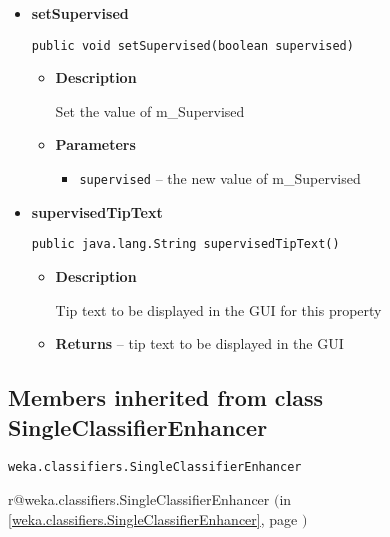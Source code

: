 \documentclass[11pt,a4paper]{report}
\makeatletter
\newcommand{\refdefined}[1]{
\expandafter\ifx\csname r@#1\endcsname\relax
\relax\else
{$($in \ref{#1}, page \pageref{#1}$)$}\fi}
\makeatother
\begin{document}
{{{{{\begin{itemize}
{\begin{itemize}
{Set the value of m\_RandomData
}
\item{
{\bf  Parameters}
  \begin{itemize}
   \item{
\texttt{randomData} -- new value of m\_RandomData}
  \end{itemize}
}%
\end{itemize}
}%
\item{ 
{\bf  setSupervised}\\
\begin{lstlisting}[frame=none]
public void setSupervised(boolean supervised)\end{lstlisting} %
\begin{itemize}
\item{
{\bf  Description}

Set the value of m\_Supervised
}
\item{
{\bf  Parameters}
  \begin{itemize}
   \item{
\texttt{supervised} -- the new value of m\_Supervised}
  \end{itemize}
}%
\end{itemize}
}%
\item{ 
{\bf  supervisedTipText}\\
\begin{lstlisting}[frame=none]
public java.lang.String supervisedTipText()\end{lstlisting} %
\begin{itemize}
\item{
{\bf  Description}

Tip text to be displayed in the GUI for this property
}
\item{{\bf  Returns} -- 
tip text to be displayed in the GUI 
}%
\end{itemize}
}%
\end{itemize}
}
\subsection{Members inherited from class SingleClassifierEnhancer }{
\texttt{weka.classifiers.SingleClassifierEnhancer} {\small 
\refdefined{weka.classifiers.SingleClassifierEnhancer}}
{\small 

}}}}}}
\end{document}
